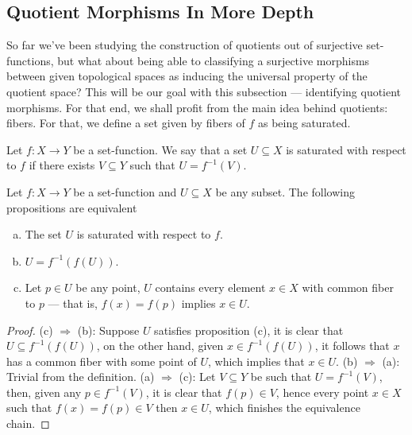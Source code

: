 \subsection{Quotient Morphisms In More Depth}

So far we've been studying the construction of quotients out of surjective
set-functions, but what about being able to classifying a surjective morphisms
between given topological spaces as inducing the universal property of the
quotient space? This will be our goal with this subsection --- identifying
quotient morphisms. For that end, we shall profit from the main idea behind
quotients: fibers. For that, we define a set given by fibers of \(f\) as being
saturated.

\begin{definition}
\label{def:saturated-fiber}
Let \(f: X \to Y\) be a set-function. We say that a set \(U \subseteq X\) is
saturated with respect to \(f\) if there exists \(V \subseteq Y\) such that
\(U = f^{-1}(V)\).
\end{definition}

\begin{proposition}
\label{prop:equivalences-saturated-fiber}
Let \(f: X \to Y\) be a set-function and \(U \subseteq X\) be any subset. The
following propositions are equivalent
\begin{enumerate}[(a)]\setlength\itemsep{0em}
\item The set \(U\) is saturated with respect to \(f\).
\item \(U = f^{-1}(f(U))\).
\item Let \(p \in U\) be any point, \(U\) contains every element \(x \in X\)
  with common fiber to \(p\) --- that is, \(f(x) = f(p)\) implies \(x \in U\).
\end{enumerate}
\end{proposition}

\begin{proof}
(c) \(\Rightarrow\) (b): Suppose \(U\) satisfies proposition (c), it is clear
that \(U \subseteq f^{-1}(f(U))\), on the other hand, given \(x \in
f^{-1}(f(U))\), it follows that \(x\) has a common fiber with some point of
\(U\), which implies that \(x \in U\). (b) \(\Rightarrow\) (a): Trivial from the
definition. (a) \(\Rightarrow\) (c): Let \(V \subseteq Y\) be such that \(U =
f^{-1}(V)\), then, given any \(p \in f^{-1}(V)\), it is clear that \(f(p) \in
V\), hence every point \(x \in X\) such that \(f(x) = f(p) \in V\) then \(x \in
U\), which finishes the equivalence chain.
\end{proof}

